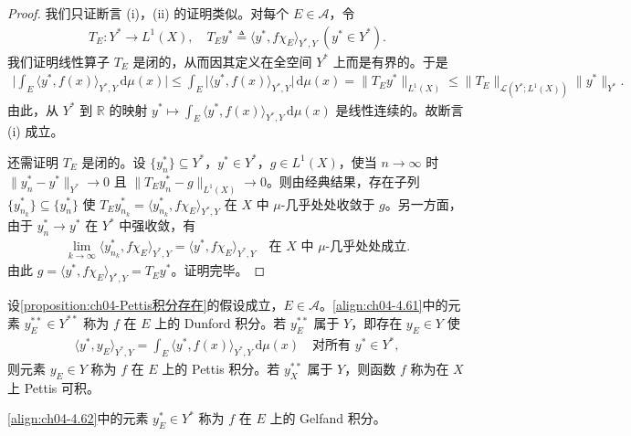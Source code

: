 \documentclass[../../main.tex]{subfiles}%
\begin{document}
\begin{proof}
我们只证断言 (i)，(ii) 的证明类似。对每个 $E\in\mathcal{A}$，令
\begin{align*}
T_E:Y^*\to L^1(X),\quad T_E y^*\triangleq \langle y^*,f\chi_E\rangle_{Y^*,Y}\ (y^*\in Y^*).
\end{align*}
我们证明线性算子 $T_E$ 是闭的，从而因其定义在全空间 $Y^*$ 上而是有界的。于是
\begin{align*}
\Big|\int_E\langle y^*,f(x)\rangle_{Y^*,Y}\,\mathrm{d}\mu(x)\Big|
\leqslant\int_E\big|\langle y^*,f(x)\rangle_{Y^*,Y}\big|\,\mathrm{d}\mu(x)
=\|T_E y^*\|_{L^1(X)}
\leqslant\|T_E\|_{\mathcal{L}(Y^*;L^1(X))}\|y^*\|_{Y^*}.
\end{align*}
由此，从 $Y^*$ 到 $\mathbb{R}$ 的映射 $y^*\mapsto\int_E\langle y^*,f(x)\rangle_{Y^*,Y}\,\mathrm{d}\mu(x)$ 是线性连续的。故断言 (i) 成立。

还需证明 $T_E$ 是闭的。设 $\{y_n^*\}\subseteq Y^*$，$y^*\in Y^*$，$g\in L^1(X)$，使当 $n\to\infty$ 时 $\|y_n^*-y^*\|_{Y^*}\to0$ 且 $\|T_E y_n^*-g\|_{L^1(X)}\to0$。则由经典结果，存在子列 $\{y_{n_k}^*\}\subseteq\{y_n^*\}$ 使 $T_E y_{n_k}^*=\langle y_{n_k}^*,f\chi_E\rangle_{Y^*,Y}$ 在 $X$ 中 $\mu$-几乎处处收敛于 $g$。另一方面，由于 $y_n^*\to y^*$ 在 $Y^*$ 中强收敛，有
\begin{align*}
\lim_{k\to\infty}\langle y_{n_k}^*,f\chi_E\rangle_{Y^*,Y}=\langle y^*,f\chi_E\rangle_{Y^*,Y}\quad\text{在 }X\text{ 中 }\mu\text{-几乎处处成立}.
\end{align*}
由此 $g=\langle y^*,f\chi_E\rangle_{Y^*,Y}=T_E y^*$。证明完毕。
\end{proof}

\begin{definition}\label{definition:ch04-弱积分}
设\cref{proposition:ch04-Pettis积分存在}的假设成立，$E\in\mathcal{A}$。\eqref{align:ch04-4.61}中的元素 $y_E^{**}\in Y^{**}$ 称为 $f$ 在 $E$ 上的 Dunford 积分。若 $y_E^{**}$ 属于 $Y$，即存在 $y_E\in Y$ 使
\begin{align}
\langle y^*,y_E\rangle_{Y^*,Y}=\int_E\langle y^*,f(x)\rangle_{Y^*,Y}\,\mathrm{d}\mu(x)\quad\text{对所有 }y^*\in Y^*, \label{align:ch04-4.63}
\end{align}
则元素 $y_E\in Y$ 称为 $f$ 在 $E$ 上的 Pettis 积分。若 $y_X^{**}$ 属于 $Y$，则函数 $f$ 称为在 $X$ 上 Pettis 可积。

\eqref{align:ch04-4.62}中的元素 $y_E^*\in Y^*$ 称为 $f$ 在 $E$ 上的 Gelfand 积分。
\end{definition}
\end{document}
